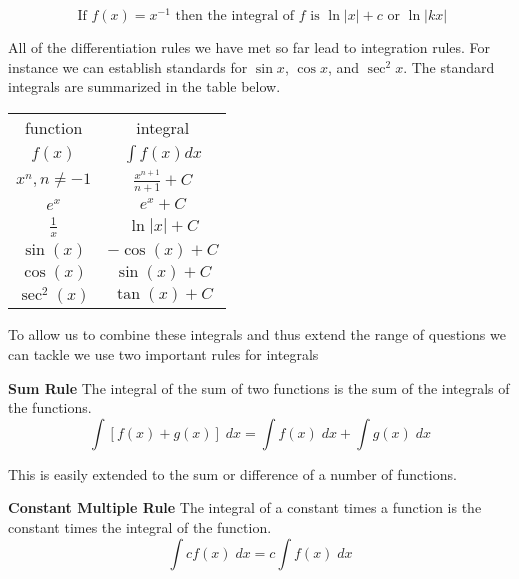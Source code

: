 \begin{equation*}\text{ If }f (x) =x^{ -1}\text{ then the integral of }f\text{ is }\ln  \left \vert x\right \vert  +c\text{ or }\ln  \left \vert k x\right \vert
\end{equation*}



All of the differentiation rules we have met so far lead to integration rules. For instance we can establish standards for $\sin  x$, $\cos  x$, and $\sec ^{2} x\text{.}$ The standard integrals are summarized in the table below.
\renewcommand\arraystretch{1.5}
\begin{center}
	\begin{tabular}{cc}
		\toprule
		function&integral\\
		$f(x)$  &  $\int f(x)dx$ \\ \midrule
		$x^n, n \neq -1$ & $\frac{x^{n+1}}{n+1}+C$\\ 
		$e^x$ & $e^x+C$\\ 
		$\frac{1}{x}$ & $\ln|x|+C$\\ 
		$\sin(x)$ & $-\cos(x)+C$ \\ 
		$\cos(x)$ & $\sin(x)+C$ \\ 
		$\sec^2(x)$ & $\tan(x)+C$ \\ \bottomrule
	\end{tabular}
\end{center}

To allow us to combine these integrals and thus extend the range of questions we can tackle we use two important rules for integrals 
\begin{tcolorbox}
\textbf{Sum Rule} The integral of the sum of two functions is the sum of the integrals of the functions.
\[\int \left [f (x) +g (x)\right ]\; d x =\int f (x)\; d x +\int g (x)\; d x\]
\end{tcolorbox}
This is easily extended to the sum or difference of a number of functions. 
\begin{tcolorbox}
\textbf{Constant Multiple Rule} The integral of a constant times a function is the constant times the integral of the function.
\[\int c f (x)\; d x =c \int f (x)\; d x
\]\end{tcolorbox}

